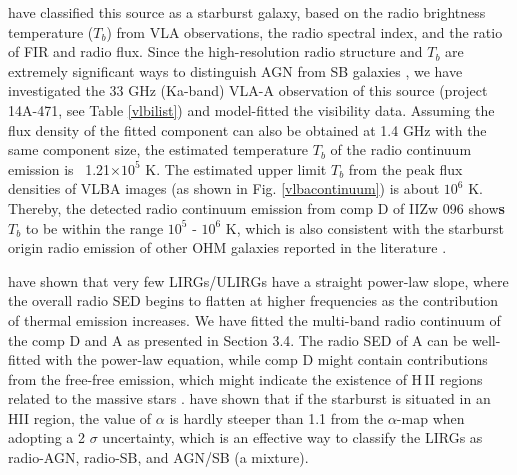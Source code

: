 \documentclass[]{aa} %
\newcommand{\HII}{{\rm H\,{\scriptsize II}}\xspace}
\begin{document}
\cite{2006A&A...449..559B} have classified this source as a starburst galaxy, based on the radio brightness temperature ($T_{b}$) from VLA observations, the radio spectral index, and the ratio of FIR and radio flux.
Since the high-resolution radio structure and $T_{b}$ are extremely significant ways to distinguish AGN from SB galaxies \citep{1991ApJ...378...65C}, %
 we have investigated the 33 GHz (Ka-band)  VLA-A observation of this source (project 14A-471, see Table \ref{vlbilist}) and model-fitted the visibility data. Assuming the flux density of the fitted component can also be obtained at 1.4 GHz with the same component size, the estimated temperature $T_{b}$ of the radio continuum emission is ~1.21$\times$$10^{5}$ K. The estimated upper limit $T_{b}$ from the peak flux densities of VLBA images (as shown in Fig. \ref{vlbacontinuum}) is about $10^{6}$ K. Thereby, the detected radio continuum emission from comp D of IIZw 096 show\textbf{s} $T_{b}$ to be within the range $10^{5}$ - $10^{6}$ K, which is also consistent with the starburst origin radio emission of other OHM galaxies reported in the literature \citep[e.g., IRAS 12032+1707, IRAS 02524+2046 in][]{2005A&A...443..383P,2020A&A...638A..78P}.

\cite{2008A&A...477...95C} have shown that very few LIRGs/ULIRGs have a straight power-law slope, where the overall radio SED begins to flatten at higher frequencies as the contribution of thermal emission increases. We have fitted the multi-band radio continuum of the comp D and A as presented in Section 3.4. The radio SED of A can be well-fitted with the power-law equation, while comp D might contain contributions from the free-free emission, which might indicate the existence of \HII regions related to the massive stars \citep{2019ApJ...881...70L}.  \cite{2015A&A...574A...4V} have shown that if the starburst is situated in an HII region, the value of $\alpha$ is hardly steeper than  1.1 from the $\alpha$-map when adopting a 2 $\sigma$ uncertainty, which is an effective way to classify the LIRGs as radio-AGN, radio-SB, and AGN/SB (a mixture).





\end{document}
